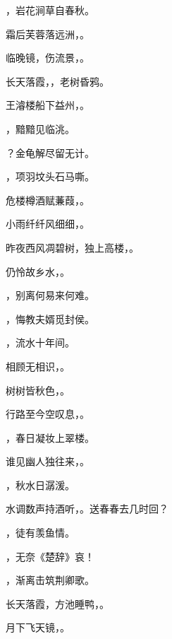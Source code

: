 \documentclass[12pt, a4paper, addpoints]{exam}
\begin{document}
\begin{questions}
\question[1] \uline{\qquad\qquad\qquad}，岩花涧草自春秋。

\question[1] 霜后芙蓉落远洲，\uline{\qquad\qquad\qquad}。

\question[1] 临晚镜，伤流景，\uline{\qquad\qquad\qquad}。

\question[1] 长天落霞，\uline{\qquad\qquad\qquad}，老树昏鸦。

\question[1] 王濬楼船下益州，\uline{\qquad\qquad\qquad}。

\question[1] \uline{\qquad\qquad\qquad}，黯黯见临洮。

\question[1] \uline{\qquad\qquad\qquad}？金龟解尽留无计。

\question[1] \uline{\qquad\qquad\qquad}，项羽坟头石马嘶。

\question[1] 危楼樽酒赋蒹葭，\uline{\qquad\qquad\qquad}。

\question[1] 小雨纤纤风细细，\uline{\qquad\qquad\qquad}。

\question[1] 昨夜西风凋碧树，独上高楼，\uline{\qquad\qquad\qquad}。

\question[1] 仍怜故乡水，\uline{\qquad\qquad\qquad}。

\question[1] \uline{\qquad\qquad\qquad}，别离何易来何难。

\question[1] \uline{\qquad\qquad\qquad}，悔教夫婿觅封侯。

\question[1] \uline{\qquad\qquad\qquad}，流水十年间。

\question[1] 相顾无相识，\uline{\qquad\qquad\qquad}。

\question[1] 树树皆秋色，\uline{\qquad\qquad\qquad}。

\question[1] 行路至今空叹息，\uline{\qquad\qquad\qquad}。

\question[1] \uline{\qquad\qquad\qquad}，春日凝妆上翠楼。

\question[1] 谁见幽人独往来，\uline{\qquad\qquad\qquad}。

\question[1] \uline{\qquad\qquad\qquad}，秋水日潺湲。

\question[1] 水调数声持酒听，\uline{\qquad\qquad\qquad}。送春春去几时回？

\question[1] \uline{\qquad\qquad\qquad}，徒有羡鱼情。

\question[1] \uline{\qquad\qquad\qquad}，无奈《楚辞》哀！

\question[1] \uline{\qquad\qquad\qquad}，渐离击筑荆卿歌。

\question[1] 长天落霞，方池睡鸭，\uline{\qquad\qquad\qquad}。

\question[1] 月下飞天镜，\uline{\qquad\qquad\qquad}。


\end{questions}
\end{document}
